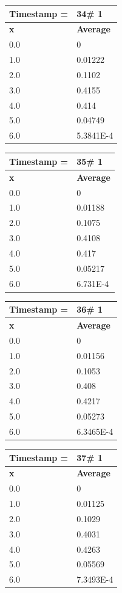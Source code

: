 \begin{tabular}{|l||l|}
\hline
\textbf{Timestamp =} & \textbf{34}\# 1\\\hline
	\textbf{x} & \textbf{Average} \\ \hline
\hline
	0.0 & 0 \\ \hline
	1.0 & 0.01222 \\ \hline
	2.0 & 0.1102 \\ \hline
	3.0 & 0.4155 \\ \hline
	4.0 & 0.414 \\ \hline
	5.0 & 0.04749 \\ \hline
	6.0 & 5.3841E-4 \\ \hline
\end{tabular}
\begin{tabular}{|l||l|}
\hline
\textbf{Timestamp =} & \textbf{35}\# 1\\\hline
	\textbf{x} & \textbf{Average} \\ \hline
\hline
	0.0 & 0 \\ \hline
	1.0 & 0.01188 \\ \hline
	2.0 & 0.1075 \\ \hline
	3.0 & 0.4108 \\ \hline
	4.0 & 0.417 \\ \hline
	5.0 & 0.05217 \\ \hline
	6.0 & 6.731E-4 \\ \hline
\end{tabular}

\begin{tabular}{|l||l|}
\hline
\textbf{Timestamp =} & \textbf{36}\# 1\\\hline
	\textbf{x} & \textbf{Average} \\ \hline
\hline
	0.0 & 0 \\ \hline
	1.0 & 0.01156 \\ \hline
	2.0 & 0.1053 \\ \hline
	3.0 & 0.408 \\ \hline
	4.0 & 0.4217 \\ \hline
	5.0 & 0.05273 \\ \hline
	6.0 & 6.3465E-4 \\ \hline
\end{tabular}
\begin{tabular}{|l||l|}
\hline
\textbf{Timestamp =} & \textbf{37}\# 1\\\hline
	\textbf{x} & \textbf{Average} \\ \hline
\hline
	0.0 & 0 \\ \hline
	1.0 & 0.01125 \\ \hline
	2.0 & 0.1029 \\ \hline
	3.0 & 0.4031 \\ \hline
	4.0 & 0.4263 \\ \hline
	5.0 & 0.05569 \\ \hline
	6.0 & 7.3493E-4 \\ \hline
\end{tabular}

